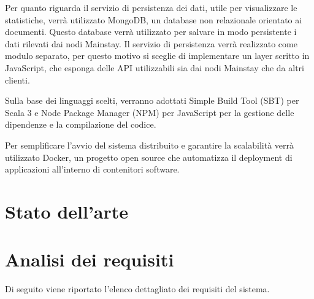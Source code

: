 \documentclass[12pt]{article}
\begin{document}
Per quanto riguarda il servizio di persistenza dei dati, utile per visualizzare le statistiche, verrà utilizzato MongoDB, un database non relazionale orientato ai documenti. Questo database verrà utilizzato per salvare in modo persistente i dati rilevati dai nodi Mainstay.
Il servizio di persistenza verrà realizzato come modulo separato, per questo motivo si sceglie di implementare un layer scritto in JavaScript, che esponga delle API utilizzabili sia dai nodi Mainstay che da altri clienti.

Sulla base dei linguaggi scelti, verranno adottati Simple Build Tool (SBT) per Scala 3 e Node Package Manager (NPM) per JavaScript per la gestione delle dipendenze e la compilazione del codice.

Per semplificare l'avvio del sistema distribuito e garantire la scalabilità verrà utilizzato Docker, un progetto open source che automatizza il deployment di applicazioni all'interno di contenitori software.

\newpage


\section{Stato dell'arte}



\newpage



\section{Analisi dei requisiti}

Di seguito viene riportato l'elenco dettagliato dei requisiti del sistema.
\end{document}
